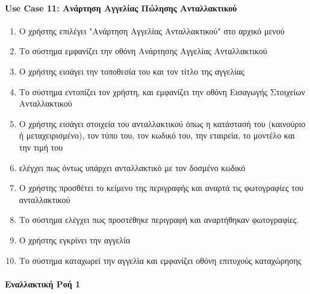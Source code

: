 \documentclass{../ol-softwaremanual}
\begin{document}
	
	
	\paragraph{\en Use Case 11: \gr Ανάρτηση Αγγελίας Πώλησης Ανταλλακτικού \gr}
	
	\begin{enumerate}
		\item Ο χρήστης επιλέγει \en"\gr Ανάρτηση Αγγελίας Ανταλλακτικού\en" \gr στο αρχικό μενού
		\item Το σύστημα εμφανίζει την οθόνη Ανάρτησης Αγγελίας Ανταλλακτικού
		\item Ο χρήστης εισάγει την τοποθεσία του και τον τίτλο της αγγελίας		
		\item Το σύστημα εντοπίζει τον χρήστη,  και εμφανίζει την οθόνη Εισαγωγής Στοιχείων Ανταλλακτικού		
		\item Ο χρήστης εισάγει στοιχεία του ανταλλακτικού όπως η κατάστασή του (καινούριο ή μεταχειρισμένο), τον τύπο του, τον κωδικό του, την εταιρεία, το μοντέλο και την τιμή του		
		\item {} ελέγχει πως όντως υπάρχει ανταλλακτικό με τον δοσμένο κωδικό		
		\item Ο χρήστης προσθέτει το κείμενο της περιγραφής και αναρτά τις φωτογραφίες του ανταλλακτικού		
		\item Το σύστημα ελέγχει πως προστέθηκε περιγραφή και αναρτήθηκαν φωτογραφίες. 		
		\item Ο χρήστης εγκρίνει την αγγελία		
		\item Το σύστημα καταχωρεί την αγγελία και εμφανίζει οθόνη επιτυχούς καταχώρησης
	\end{enumerate}
	
	
	\paragraph{Εναλλακτική Ροή 1}
	
\end{document}
